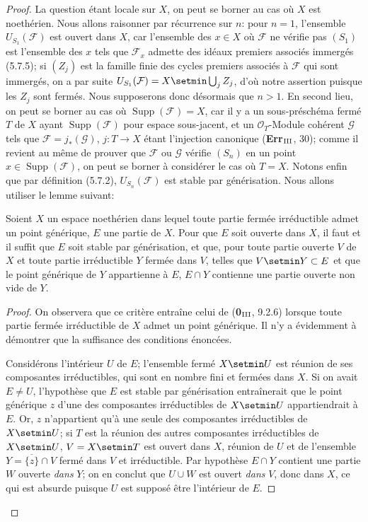 \begin{proof}
La question étant locale sur $X$, on peut se borner au cas où $X$ est
noethérien. Nous allons raisonner par récurrence sur $n$: pour $n=1$,
l'ensemble $U_{S_1}(\mathcal F)$ est ouvert dans $X$, car l'ensemble des
$x\in X$ où $\mathcal F$ ne vérifie pas $(S_1)$ est l'ensemble des $x$ tels
que $\mathcal F_x$ admette des idéaux premiers associés immergés (5.7.5);
si $(Z_j)$ est la famille finie des cycles premiers associés à $\mathcal F$
qui sont immergés, on a par suite
$U_{S_1}(\mathcal F)=X\setmin\bigcup_jZ_j$, d'où notre assertion puisque les
$Z_j$ sont fermés. Nous supposerons donc désormais que $n>1$. En second
lieu, on peut se borner au cas où
$\operatorname{Supp}(\mathcal F)=X$, car il y a un sous-préschéma fermé
$T$ de $X$ ayant $\operatorname{Supp}(\mathcal F)$ pour espace sous-jacent,
et un $\mathcal O_T$-Module cohérent $\mathcal G$ tels que
$\mathcal F=j_*(\mathcal G)$, $j:T\to X$ étant l'injection canonique
(\textbf{Err}$_{\rm III}$, 30); comme il revient au même de prouver que $\mathcal F$
ou $\mathcal G$ vérifie $(S_n)$ en un point
$x\in\operatorname{Supp}(\mathcal F)$, on peut se borner à considérer le
cas où $T=X$. Notons enfin que par définition (5.7.2),
$U_{S_n}(\mathcal F)$ est stable par générisation. Nous allons utiliser le
lemme suivant:

\begin{lemma}[6.11.6.1]
\label{IV.2.s6.11.6.1-fr}
Soient $X$ un espace noethérien dans lequel toute partie fermée irréductible
admet un point générique, $E$ une partie de $X$. Pour que $E$ soit ouverte
dans $X$, il faut et il suffit que $E$ soit stable par générisation, et que,
pour toute partie ouverte $V$ de $X$ et toute partie irréductible $Y$ fermée
dans $V$, telles que $V\setmin Y\subset E$ et que le point générique de $Y$
appartienne à $E$, $E\cap Y$ contienne une partie ouverte non vide de $Y$.
\end{lemma}

\begin{proof}
On observera que ce critère entraîne celui de (\textbf{0}$_{\rm III}$, 9.2.6)
lorsque toute partie fermée irréductible de $X$ admet un point générique.
Il n'y a évidemment à démontrer que la suffisance des conditions énoncées.

Considérons l'intérieur $U$ de $E$; l'ensemble fermé $X\setmin U$ est réunion de
ses composantes irréductibles, qui sont en nombre fini et fermées dans $X$.
Si on avait $E\ne U$, l'hypothèse que $E$ est stable par générisation
entraînerait que le point générique $z$ d'une des composantes irréductibles
de $X\setmin U$ appartiendrait à $E$. Or, $z$ n'appartient qu'à une seule des
composantes irréductibles de $X\setmin U$; si $T$ est la réunion des autres
composantes irréductibles de $X\setmin U$, $V=X\setmin T$ est ouvert dans $X$, réunion de
$U$ et de l'ensemble $Y=\overline{\{z\}}\cap V$ fermé dans $V$ et
irréductible. Par hypothèse $E\cap Y$ contient une partie $W$ ouverte \emph{dans}
$Y$; on en conclut que $U\cup W$ est ouvert \emph{dans} $V$, donc dans $X$, ce qui
est absurde puisque $U$ est supposé être l'intérieur de $E$.
\end{proof}


\end{proof}
